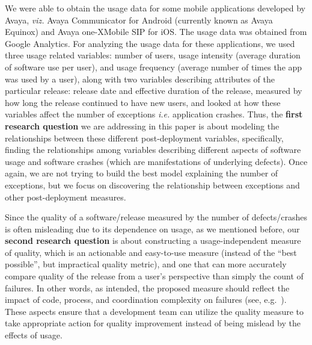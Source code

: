 \documentclass[smallcondensed]{svjour3}     %
\begin{document}
We were able to obtain the usage data for some mobile applications developed by Avaya, \textit{viz.}  Avaya Communicator for Android (currently known as Avaya Equinox\textregistered) and Avaya one-X\textregistered  Mobile SIP for iOS. The usage data was obtained from Google Analytics. 
For analyzing the usage data for these applications, we used three usage related variables: number of users, 
usage intensity (average duration of software use per user), and usage frequency 
(average number of times the app was used by a user), along with two variables describing attributes 
of the particular release: release date and effective duration of the release, measured by how 
long the release continued to have new users, and looked at how these variables affect 
the number of exceptions \textit{i.e.} application crashes.  Thus, the \textbf{first research question} we are addressing in this paper is about modeling the relationships between these different post-deployment variables, specifically, finding the relationships among variables describing different aspects of software
usage and software crashes (which are manifestations of underlying defects). Once again, we are not trying to build the best model explaining the number of exceptions, but we focus on discovering the relationship between exceptions and other post-deployment measures.

Since the quality of a software/release measured by the number of defects/crashes is often misleading due to its dependence on usage, as we mentioned before, our \textbf{second research question} is about constructing a usage-independent measure of quality, which is  an actionable and easy-to-use measure (instead of the ``best possible'', but impractical quality metric), and one that can more accurately compare quality of the release from a user’s perspective than simply the count of failures.
 In other words, as intended, the proposed measure should reflect the impact of code, process, and coordination complexity on failures (see, e.g.~\cite{CMRH09}). These aspects ensure that a development team can utilize the quality measure to take appropriate action for quality improvement instead of being mislead by the effects of usage.
\end{document}
